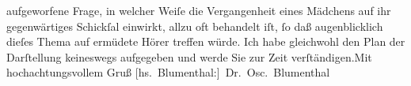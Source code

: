 \begin{ledgroupsized}[t]{13cm}
               aufgeworfene Frage, in welcher Weiſe die Vergangenheit eines Mädchens auf ihr
               gegenwärtiges Schickſal einwirkt, allzu oft behandelt iſt, ſo daß augenblicklich
               dieſes Thema auf ermüdete Hörer treffen würde. Ich habe gleichwohl den Plan der
               Darſtellung keineswegs aufgegeben und werde Sie zur Zeit verſtändigen.\hspace*{2.5em}Mit hochachtungsvollem Gruß\pend
           \pstart \spacefill\mbox{{[}hs. Blumenthal:{]} Dr. Osc. Blumenthal}\pend{}
         
         \endnumbering{}\end{ledgroupsized}  \newcommand{\dateiname}{L00253}\newcommand{\titel}{Oscar Blumenthal an Arthur Schnitzler, 12. 8. 1893}\newcommand{\editorInnen}{Martin Anton Müller und Gerd-Hermann Susen}
      